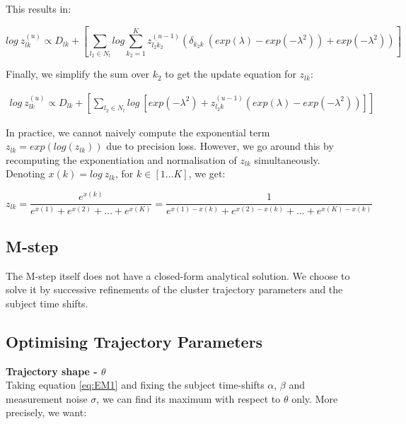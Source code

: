 This results in:

\small
\begin{equation}
 log\ z_{lk}^{(u)} \propto  D_{lk} + \left[\sum_{l_2 \in N_l} log \sum_{k_2 = 1}^K z_{l_2k_2}^{(u-1)} (\delta_{k_2 k}\ (exp(\lambda) - exp(-\lambda^2)) + exp(-\lambda^2)) \right]
\end{equation}
\normalsize


Finally, we simplify the sum over $k_2$ to get the update equation for $z_{lk}$:

\begin{equation}
\label{eq:app_e-step}
\begin{split}
 log\ z_{lk}^{(u)} \propto D_{lk}+ \left[ \sum_{l_2 \in N_l} log\ \left[ exp(-\lambda^2) + z_{l_2k}^{(u-1)} (exp(\lambda) - exp(-\lambda^2)) \right] \right]
\end{split}
\end{equation}

In practice, we cannot naively compute the exponential term $z_{lk} = exp(log(z_{lk}))$ due to precision loss. However, we go around this by recomputing the exponentiation and normalisation of $z_{lk}$ simultaneously. Denoting $x(k) = log\ z_{lk}$, for  $k \in [1 \dots K]$, we get: 

\begin{equation}
 z_{lk}  = \frac{e^{x(k)}}{e^{x(1)}+e^{x(2)} + \dots + e^{x(K)}} = \frac{1}{e^{x(1)-x(k)} +e^{x(2)-x(k)} + \dots + e^{x(K)-x(k)}}
\end{equation}



\subsection{M-step}

The M-step itself does not have a closed-form analytical solution. We choose to solve it by successive refinements of the cluster trajectory parameters and the subject time shifts. 

\subsection{Optimising Trajectory Parameters}


\textbf{Trajectory shape - $\theta$}\\

Taking equation \ref{eq:EM1} and fixing the subject time-shifts $\alpha$, $\beta$ and measurement noise $\sigma$, we can find its maximum with respect to $\theta$ only. More precisely, we want:

